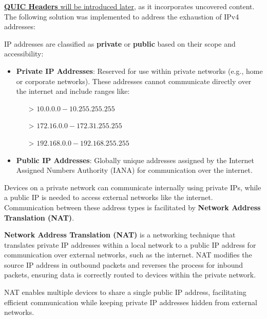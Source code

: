 \noindent
\underline{\textbf{QUIC Headers} will be introduced later,} as it incorporates uncovered content. The following solution was implemented to address the exhaustion of IPv4 addresses:
\begin{Def}

    IP addresses are classified as \textbf{private} or \textbf{public} based on their scope and accessibility:
    \begin{itemize}
        \item \textbf{Private IP Addresses}: Reserved for use within private networks (e.g., home or corporate networks). These addresses cannot communicate directly over the internet and include ranges like:
            \begin{itemize}
                \item[>] \(10.0.0.0 - 10.255.255.255\)
                \item[>] \(172.16.0.0 - 172.31.255.255\)
                \item[>] \(192.168.0.0 - 192.168.255.255\)
            \end{itemize}
        \item \textbf{Public IP Addresses}: Globally unique addresses assigned by the Internet Assigned Numbers Authority (IANA) for communication over the internet.
    \end{itemize}

    \noindent
    Devices on a private network can communicate internally using private IPs, while a public IP is needed to access external networks like the internet. Communication between these address types is facilitated by \textbf{Network Address Translation (NAT)}.
    \hfill \cite{rfc1918}
\end{Def}


\begin{Def}

    \textbf{Network Address Translation (NAT)} is a networking technique that translates private IP addresses within a local network to a public IP address for communication over external networks, such as the internet.
    NAT modifies the source IP address in outbound packets and reverses the process for inbound packets, ensuring data is correctly routed to devices within the private network.

    NAT enables multiple devices to share a single public IP address,
    facilitating efficient communication while keeping private IP addresses hidden from external networks.  \hfill \cite{rfc1918}\cite{rfc2663}   
\end{Def}

